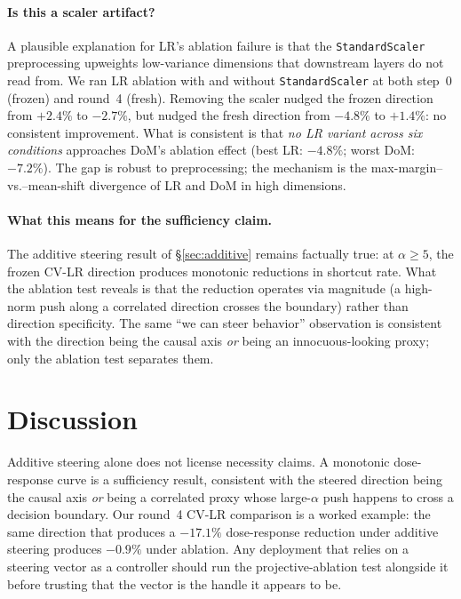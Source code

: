 \documentclass[11pt]{article}
\begin{document}
\paragraph{Is this a scaler artifact?} A plausible explanation for
LR's ablation failure is that the \texttt{StandardScaler}
preprocessing upweights low-variance dimensions that downstream layers
do not read from. We ran LR ablation with and without
\texttt{StandardScaler} at both step~0 (frozen) and round~4 (fresh).
Removing the scaler nudged the frozen direction from $+2.4\%$ to
$-2.7\%$, but nudged the fresh direction from $-4.8\%$ to $+1.4\%$:
no consistent improvement. What is consistent is that \emph{no LR
variant across six conditions} approaches DoM's ablation effect (best
LR: $-4.8\%$; worst DoM: $-7.2\%$). The gap is robust to
preprocessing; the mechanism is the max-margin--vs.--mean-shift
divergence of LR and DoM in high dimensions.

\paragraph{What this means for the sufficiency claim.} The additive
steering result of \S\ref{sec:additive} remains factually true: at
$\alpha \geq 5$, the frozen CV-LR direction produces monotonic
reductions in shortcut rate. What the ablation test reveals is that
the reduction operates via magnitude (a high-norm push along a
correlated direction crosses the boundary) rather than direction
specificity. The same ``we can steer behavior'' observation is
consistent with the direction being the causal axis \emph{or} being an
innocuous-looking proxy; only the ablation test separates them.

\section{Discussion}
\label{sec:discussion}

Additive steering alone does not license necessity claims. A
monotonic dose-response curve is a sufficiency result, consistent
with the steered direction being the causal axis \emph{or} being a
correlated proxy whose large-$\alpha$ push happens to cross a decision
boundary. Our round~4 CV-LR comparison is a worked example: the same
direction that produces a $-17.1\%$ dose-response reduction under
additive steering produces $-0.9\%$ under ablation. Any deployment
that relies on a steering vector as a controller should run the
projective-ablation test alongside it before trusting that the vector
is the handle it appears to be.
\end{document}
